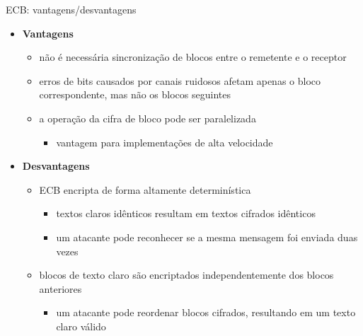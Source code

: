 \documentclass{beamer}
\begin{document}
\begin{frame}{ECB: vantagens/desvantagens}

\begin{itemize}
    \item \textbf{Vantagens}
    \begin{itemize}
        \item não é necessária sincronização de blocos entre o remetente e o receptor
        \item erros de bits causados por canais ruidosos afetam apenas o bloco correspondente, mas não os blocos seguintes
        \item a operação da cifra de bloco pode ser paralelizada
        \begin{itemize}
            \item vantagem para implementações de alta velocidade
        \end{itemize}
    \end{itemize}

    \vspace{0.5em}

    \item \textbf{Desvantagens}
    \begin{itemize}
        \item ECB encripta de forma altamente determinística
        \begin{itemize}
            \item textos claros idênticos resultam em textos cifrados idênticos
            \item um atacante pode reconhecer se a mesma mensagem foi enviada duas vezes
        \end{itemize}
        \item blocos de texto claro são encriptados independentemente dos blocos anteriores
        \begin{itemize}
            \item um atacante pode reordenar blocos cifrados, resultando em um texto claro válido
        \end{itemize}
    \end{itemize}
\end{itemize}

\end{frame}

\end{document}
